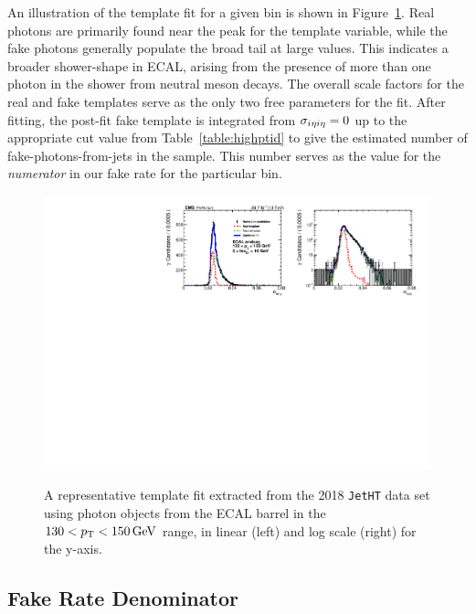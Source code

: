 An illustration of the template fit for a given \pt bin is shown in Figure~\ref{fig:templatefit}. Real photons are primarily found near the peak for the \sieie template variable, while the fake photons generally populate the broad tail at large \sieie values. This indicates a broader shower-shape in ECAL, arising from the presence of more than one photon in the shower from neutral meson decays. The overall scale factors for the real and fake templates serve as the only two free parameters for the fit. After fitting, the post-fit fake template is integrated from $\sigma_{i\eta i\eta}=0$ up to the appropriate cut value from Table~\ref{table:highptid} to give the estimated number of fake-photons-from-jets in the sample. This number serves as the value for the \emph{numerator} in our fake rate for the particular \pt bin. 

\begin{figure}[!htbp]
\caption{A representative template fit extracted from the 2018 \texttt{JetHT} data set using photon objects from the ECAL barrel in the $130<p_{\mathrm{T}}<150\,\text{Ge\hspace{-.08em}V}$ range, in linear (left) and log scale (right) for the y-axis.}
\centering
\includegraphics[scale=0.80]{fig/fakeRatePlot_jetht_2018_EE_pT130To150_chIso5To10.pdf}
\label{fig:templatefit}
\end{figure}

\subsection{Fake Rate Denominator}

